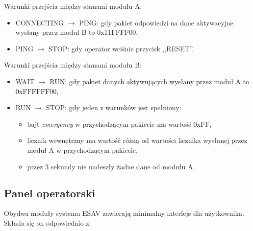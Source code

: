 Warunki przejścia między stanami modułu A:

\begin{itemize}
\item CONNECTING $\rightarrow$ PING: gdy pakiet odpowiedzi na dane aktywacyjne wysłany przez moduł B to $0\mathrm{x}11\mathrm{FFFF}00$,
\item PING $\rightarrow$ STOP: gdy operator wciśnie przycisk ,,RESET''.
\end{itemize}

Warunki przejścia między stanami modułu B:

\begin{itemize}
\item WAIT $\rightarrow$ RUN: gdy pakiet danych aktywujących wysłany przez moduł A to $0\mathrm{xFFFFFF}00$,
\item RUN $\rightarrow$ STOP: gdy jeden z warunków jest spełniony:
    \begin{itemize}
    \item bajt \textit{emergency} w przychodzącym pakiecie ma wartość $0\mathrm{xFF}$,
    \item licznik wewnętrzny ma wartość różną od wartości licznika wysłanej przez moduł A w przychodzącym pakiecie,
    \item przez 3 sekundy nie nadeszły żadne dane od modułu A.
    \end{itemize}
\end{itemize}

\subsection{Panel operatorski}
\label{subsec:panel_operatorski}

Obydwa moduły systemu ESAV zawierają minimalny interfejs dla użytkownika. Składa się on odpowiednio z:

